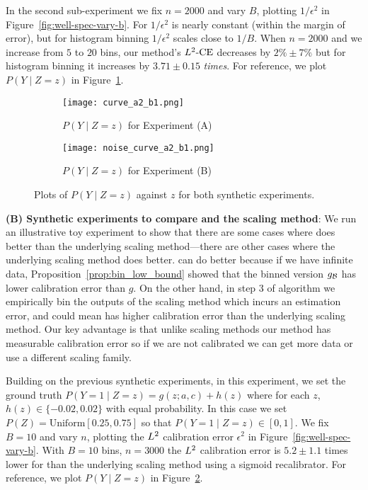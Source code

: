 In the second sub-experiment we fix $n = 2000$ and vary $B$, plotting $1/\epsilon^2$ in Figure~\ref{fig:well-spec-vary-b}. For \ourcal{} $1/\epsilon^2$ is nearly constant (within the margin of error), but for histogram binning $1/\epsilon^2$ scales close to $1/B$. When $n = 2000$ and we increase from $5$ to $20$ bins, our method's $L^2\mbox{-CE}$ decreases by $2\% \pm 7\%$ but for histogram binning it increases by $3.71 \pm 0.15$ \emph{times}. For reference, we plot $P(Y \mid Z = z)$ in Figure~\ref{fig:well-spec-curve}.

\begin{figure}
  \centering
  \centering
     \begin{subfigure}[b]{0.48\textwidth}
         \centering
         \texttt{[image: curve\_a2\_b1.png]}
         \caption{$P(Y \mid Z=z)$ for Experiment (A)
         }
         \label{fig:well-spec-curve}
     \end{subfigure}
     \hfill
     \begin{subfigure}[b]{0.48\textwidth}
         \centering
         \texttt{[image: noise\_curve\_a2\_b1.png]}
         \caption{$P(Y \mid Z=z)$ for Experiment (B)
         }
         \label{fig:noisy-spec-curve}
     \end{subfigure}
  \caption{
    Plots of $P(Y \mid Z=z)$ against $z$ for both synthetic experiments.
}
  \label{fig:p_y_z_plots}
\end{figure}


\textbf{(B) Synthetic experiments to compare \ourcal{} and the scaling method}: We run an illustrative toy experiment to show that there are some cases where \ourcal{} does better than the underlying scaling method---there are other cases where the underlying scaling method does better. \ourcal{} can do better because if we have infinite data, Proposition~\ref{prop:bin_low_bound} showed that the binned version $g_{\mathcal{B}{}}$ has lower calibration error than $g$. On the other hand, in step 3 of \ourcal{} algorithm we empirically bin the outputs of the scaling method which incurs an estimation error, and could mean \ourcal{} has higher calibration error than the underlying scaling method. Our key advantage is that unlike scaling methods our method has measurable calibration error so if we are not calibrated we can get more data or use a different scaling family.

Building on the previous synthetic experiments, in this experiment, we set the ground truth $P(Y = 1 \mid Z=z) = g(z; a, c) + h(z)$ where for each $z$, $h(z) \in \{-0.02, 0.02\}$ with equal probability. In this case we set $P(Z) = \mbox{Uniform}[0.25, 0.75]$ so that $P(Y = 1 \mid Z=z) \in [0, 1]$. We fix $B=10$ and vary $n$, plotting the $L^2$ calibration error $\epsilon^2$ in Figure~\ref{fig:well-spec-vary-b}. With $B=10$ bins, $n = 3000$ the $L^2$ calibration error is $5.2 \pm 1.1$ times lower for \ourcal{} than the underlying scaling method using a sigmoid recalibrator. For reference, we plot $P(Y \mid Z = z)$ in Figure~\ref{fig:noisy-spec-curve}.

